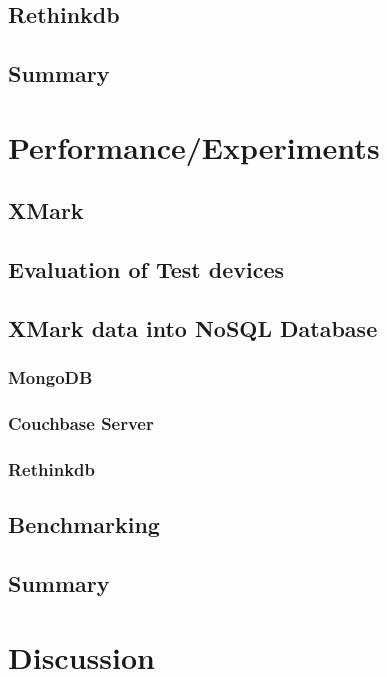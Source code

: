 \documentclass[a4paper,12pt]{article}
\begin{document}
		\subsection{Rethinkdb}		
		\subsection{Summary}
	\newpage
	\section{Performance/Experiments}
	\label{sec:four}
		\subsection{XMark}
		\label{xmark}
			
		\subsection{Evaluation of Test devices}
		\subsection{XMark data into NoSQL Database}
			\label{xmark-nosql}
			
			\newpage			
			\subsubsection{MongoDB}
			\label{xmark-mongodb}
			
			\subsubsection{Couchbase Server}
			\label{xmark-couchbase}
			
			\subsubsection{Rethinkdb}
			\label{xmark-rethinkdb}
					
		\subsection{Benchmarking}
		\subsection{Summary}
	\newpage
	\section{Discussion}
\end{document}
